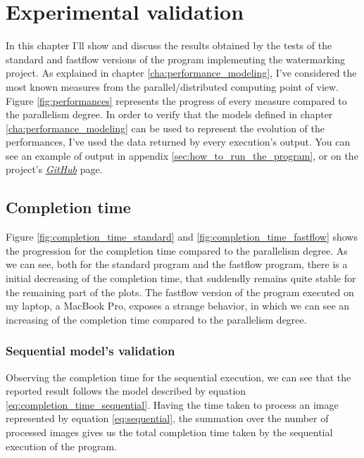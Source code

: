 \chapter{Experimental validation} %
\label{cha:experimental_validation}
    In this chapter I'll show and discuss the results obtained by the tests of the standard and fastflow
    versions of the program implementing the watermarking project. As explained in chapter
    \ref{cha:performance_modeling}, I've considered the most known measures from the parallel/distributed
    computing point of view. Figure \ref{fig:performances} represents the progress of every measure compared
    to the parallelism degree. In order to verify that the models defined in chapter
    \ref{cha:performance_modeling} can be used to represent the evolution of the performances, I've used the
    data returned by every execution's output. You can see an example of output in appendix
    \ref{sec:how_to_run_the_program}, or on the project's
    \href{https://github.com/germz01/PDS_project}{\textit{GitHub}} page.
    \section{Completion time} %
    \label{sec:completion_time}
        Figure \ref{fig:completion_time_standard} and \ref{fig:completion_time_fastflow} shows the progression
        for the completion time compared to the parallelism degree. As we can see, both for the standard program
        and the fastflow program, there is a initial decreasing of the completion time, that suddendly remains
        quite stable for the remaining part of the plots. The fastflow version of the program executed on my
        laptop, a MacBook Pro, exposes a strange behavior, in which we can see an increasing of the completion
        time compared to the parallelism degree.
        \subsection{Sequential model's validation} %
        \label{sub:sequential_model_s_validation}
            Observing the completion time for the sequential execution, we can see that the
            reported result follows the model described by equation \ref{eq:completion_time_sequential}. Having
            the time taken to process an image represented by equation \ref{eq:sequential}, the summation over
            the number of processed images gives us the total completion time taken by the sequential execution
            of the program.
